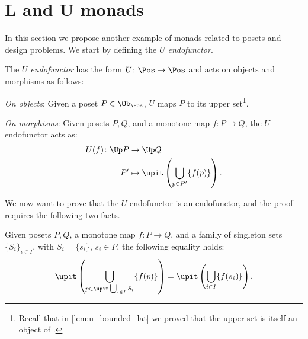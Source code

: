 \section{L and U monads}
In this section we propose another example of monads related to posets and design problems. We start by defining the \emph{$U$ endofunctor}.
\begin{definition}[$U$ endofunctor]
  \label{def:ufunctor}
  The \emph{$U$ endofunctor} has the form $U\colon \Pos \to \Pos$ and acts on objects and morphisms as follows:
  \begin{compactenum}
    \item \emph{On objects}: Given a poset $P\in \Ob_\Pos$, $U$ maps $P$ to its upper set\footnote{Recall that in \cref{lem:u_bounded_lat} we proved that the upper set is itself an object of \Pos.}.
    \item \emph{On morphisms}: Given posets $P,Q$, and a monotone map $f\colon P\to Q$, the $U$ endofunctor acts as:
    \begin{equation}
      \begin{aligned}
        U(f)\colon \Up P&\to \Up Q\\
        P'&\mapsto \upit \left( \bigcup_{p\in P'} \{f(p)\}\right).
      \end{aligned}
    \end{equation}
  \end{compactenum}
\end{definition}
We now want to prove that the $U$ endofunctor is an endofunctor, and the proof requires the following two facts.
\begin{lemma}
  \label{lem:unpack_u_functor}
  Given posets $P,Q$, a monotone map $f\colon P \to Q$, and a family of singleton sets $\{S_i\}_{i\in I}$, with $S_i=\{s_i\}$, $s_i\in P$, the following equality holds:
  \begin{equation}
    \label{eq:lemma_unpack}
    \upit\left( \bigcup_{p\in \upit \bigcup_{i\in I}S_i}\{f(p)\}\right)= \upit \left( \bigcup_{i\in I} \{f(s_i)\}\right).
  \end{equation}
\end{lemma}
